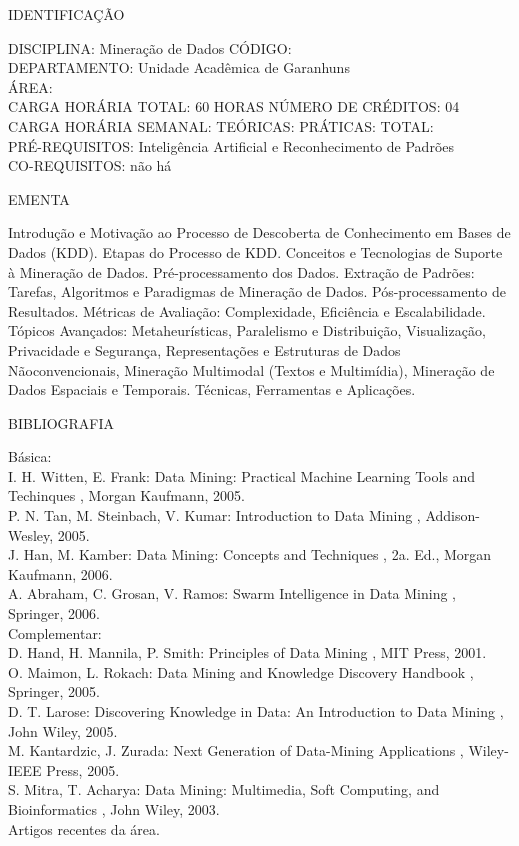 \documentclass[
	12pt,				%
	openright,			%
  oneside,     %
	a4paper,			%
	chapter=TITLE,		%
	english,			%
	french,				%
	spanish,			%
	brazil				%
	]{abntex2}
\begin{document}
\begin{apendicesenv}
\newpage IDENTIFICAÇÃO

DISCIPLINA: Mineração de Dados CÓDIGO:\\
DEPARTAMENTO: Unidade Acadêmica de Garanhuns\\
ÁREA:\\
CARGA HORÁRIA TOTAL: 60 HORAS NÚMERO DE CRÉDITOS: 04\\
CARGA HORÁRIA SEMANAL: TEÓRICAS: PRÁTICAS: TOTAL:\\
PRÉ-REQUISITOS: Inteligência Artificial e Reconhecimento de Padrões\\
CO-REQUISITOS: não há

EMENTA 

Introdução e Motivação ao Processo de Descoberta de Conhecimento em
Bases de Dados (KDD). Etapas do Processo de KDD. Conceitos e
Tecnologias de Suporte à Mineração de Dados. Pré-processamento dos
Dados. Extração de Padrões: Tarefas, Algoritmos e Paradigmas de
Mineração de Dados. Pós-processamento de Resultados. Métricas de
Avaliação: Complexidade, Eficiência e Escalabilidade. Tópicos
Avançados: Metaheurísticas, Paralelismo e Distribuição, Visualização,
Privacidade e Segurança, Representações e Estruturas de Dados
Nãoconvencionais, Mineração Multimodal (Textos e Multimídia), Mineração
de Dados Espaciais e Temporais. Técnicas, Ferramentas e Aplicações.

BIBLIOGRAFIA 

Básica:\\
I. H. Witten, E. Frank:  Data Mining: Practical
Machine Learning Tools and Techinques , Morgan
Kaufmann, 2005.\\
P. N. Tan, M. Steinbach, V. Kumar:  Introduction to
Data Mining , Addison-Wesley, 2005.\\
J. Han, M. Kamber:  Data Mining: Concepts and
Techniques , 2a. Ed., Morgan Kaufmann, 2006.\\
A. Abraham, C. Grosan, V. Ramos:  Swarm Intelligence
in Data Mining , Springer, 2006.\\
Complementar:\\
D. Hand, H. Mannila, P. Smith:  Principles of Data
Mining , MIT Press, 2001.\\
O. Maimon, L. Rokach:  Data Mining and Knowledge
Discovery Handbook , Springer, 2005.\\
D. T. Larose:  Discovering Knowledge in Data: An
Introduction to Data Mining , John Wiley, 2005.\\
M. Kantardzic, J. Zurada:  Next Generation of
Data-Mining Applications , Wiley-IEEE Press, 2005.\\
S. Mitra, T. Acharya:  Data Mining: Multimedia, Soft
Computing, and Bioinformatics , John Wiley, 2003.\\
Artigos recentes da área.


\end{apendicesenv}
\end{document}
